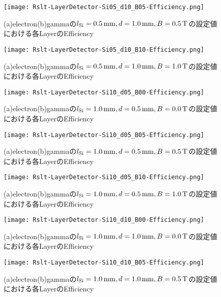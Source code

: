 \documentclass[a4paper,10pt]{jreport}
\begin{document}
\begin{figure}[H]
	\center
	\texttt{[image: Rslt-LayerDetector-Si05\_d10\_B05-Efficiency.png]}
	\caption{(a)electron(b)gammaの$l_{\rm{Si}}=\SI{0.5}{mm}, d=\SI{1.0}{mm}, B=\SI{0.5}{T}$の設定値における各LayerのEfficiency}
	\label{Rslt-LayerDetector-Si05_d10_B05-Efficiency}
\end{figure}

\begin{figure}[H]
	\center
	\texttt{[image: Rslt-LayerDetector-Si05\_d10\_B10-Efficiency.png]}
	\caption{(a)electron(b)gammaの$l_{\rm{Si}}=\SI{0.5}{mm}, d=\SI{1.0}{mm}, B=\SI{1.0}{T}$の設定値における各LayerのEfficiency}
	\label{Rslt-LayerDetector-Si05_d10_B10-Efficiency}
\end{figure}

\begin{figure}[H]
	\center
	\texttt{[image: Rslt-LayerDetector-Si10\_d05\_B00-Efficiency.png]}
	\caption{(a)electron(b)gammaの$l_{\rm{Si}}=\SI{1.0}{mm}, d=\SI{0.5}{mm}, B=\SI{0.0}{T}$の設定値における各LayerのEfficiency}
	\label{Rslt-LayerDetector-Si10_d05_B00-Efficiency}
\end{figure}

\begin{figure}[H]
	\center
	\texttt{[image: Rslt-LayerDetector-Si10\_d05\_B05-Efficiency.png]}
	\caption{(a)electron(b)gammaの$l_{\rm{Si}}=\SI{1.0}{mm}, d=\SI{0.5}{mm}, B=\SI{0.5}{T}$の設定値における各LayerのEfficiency}
	\label{Rslt-LayerDetector-Si10_d05_B05-Efficiency}
\end{figure}

\begin{figure}[H]
	\center
	\texttt{[image: Rslt-LayerDetector-Si10\_d05\_B10-Efficiency.png]}
	\caption{(a)electron(b)gammaの$l_{\rm{Si}}=\SI{1.0}{mm}, d=\SI{0.5}{mm}, B=\SI{1.0}{T}$の設定値における各LayerのEfficiency}
	\label{Rslt-LayerDetector-Si10_d05_B10-Efficiency}
\end{figure}

\begin{figure}[H]
	\center
	\texttt{[image: Rslt-LayerDetector-Si10\_d10\_B00-Efficiency.png]}
	\caption{(a)electron(b)gammaの$l_{\rm{Si}}=\SI{1.0}{mm}, d=\SI{1.0}{mm}, B=\SI{0.0}{T}$の設定値における各LayerのEfficiency}
	\label{Rslt-LayerDetector-Si10_d10_B00-Efficiency}
\end{figure}

\begin{figure}[H]
	\center
	\texttt{[image: Rslt-LayerDetector-Si10\_d10\_B05-Efficiency.png]}
	\caption{(a)electron(b)gammaの$l_{\rm{Si}}=\SI{1.0}{mm}, d=\SI{1.0}{mm}, B=\SI{0.5}{T}$の設定値における各LayerのEfficiency}
	\label{Rslt-LayerDetector-Si10_d10_B05-Efficiency}
\end{figure}
\end{document}
